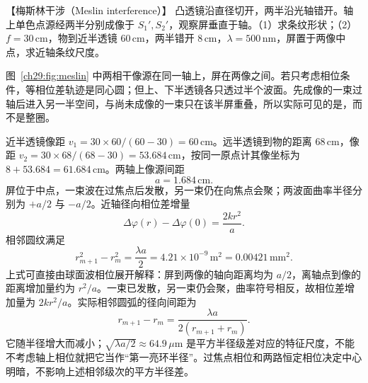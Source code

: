 \begin{origexamplebox}{【梅斯林干涉（Meslin interference）】}\label{ch29:ex:s44-21-9}
凸透镜沿直径切开，两半沿光轴错开。轴上单色点源经两半分别成像于 $S_1',S_2'$，观察屏垂直于轴。（1）求条纹形状；（2）$f=30\,\mathrm{cm}$，物到近半透镜 $60\,\mathrm{cm}$，两半错开 $8\,\mathrm{cm}$，$\lambda=500\,\mathrm{nm}$，屏置于两像中点，求近轴条纹尺度。

\begin{center}\begin{minipage}{.96\linewidth}\centering
{}
\end{minipage}\end{center}
\end{origexamplebox}\par\nopagebreak[3]
\begin{xesolution}
\MeslinSourceDiagram
图~\ref{ch29:fig:meslin} 中两相干像源在同一轴上，屏在两像之间。若只考虑相位条件，等相位差轨迹是同心圆；但上、下半透镜各只透过半个波面。先成像的一束过轴后进入另一半空间，与尚未成像的一束只在该半屏重叠，所以实际可见的是，而不是整圈。

近半透镜像距 $v_1=30\times60/(60-30)=60\,\mathrm{cm}$。远半透镜到物的距离 $68\,\mathrm{cm}$，像距 $v_2=30\times68/(68-30)=53.684\,\mathrm{cm}$，按同一原点计其像坐标为 $8+53.684=61.684\,\mathrm{cm}$。两轴上像源间距
\[
 a=1.684\,\mathrm{cm}.
\]
屏位于中点，一束波在过焦点后发散，另一束仍在向焦点会聚；两波面曲率半径分别为 $+a/2$ 与 $-a/2$。近轴径向相位差增量
\[
 \Delta\varphi(r)-\Delta\varphi(0)=\frac{2kr^2}{a}.
\]
相邻圆纹满足
\[
 \boxed{r_{m+1}^2-r_m^2=\frac{\lambda a}{2}
 =4.21\times10^{-9}\,\mathrm{m^2}=0.00421\,\mathrm{mm^2}}.
\]
上式可直接由球面波相位展开解释：屏到两像的轴向距离均为 $a/2$，离轴点到像的距离增加量约为 $r^2/a$。一束已发散，另一束仍会聚，曲率符号相反，故相位差增加量为 $2kr^2/a$。实际相邻圆弧的径向间距为
\[
 \boxed{r_{m+1}-r_m=\frac{\lambda a}{2(r_{m+1}+r_m)}}.
\]
它随半径增大而减小；$\sqrt{\lambda a/2}\approx64.9\,\mu\mathrm m$ 是平方半径级差对应的特征尺度，不能不考虑轴上相位就把它当作“第一亮环半径”。过焦点相位和两路恒定相位决定中心明暗，不影响上述相邻级次的平方半径差。
\end{xesolution}

